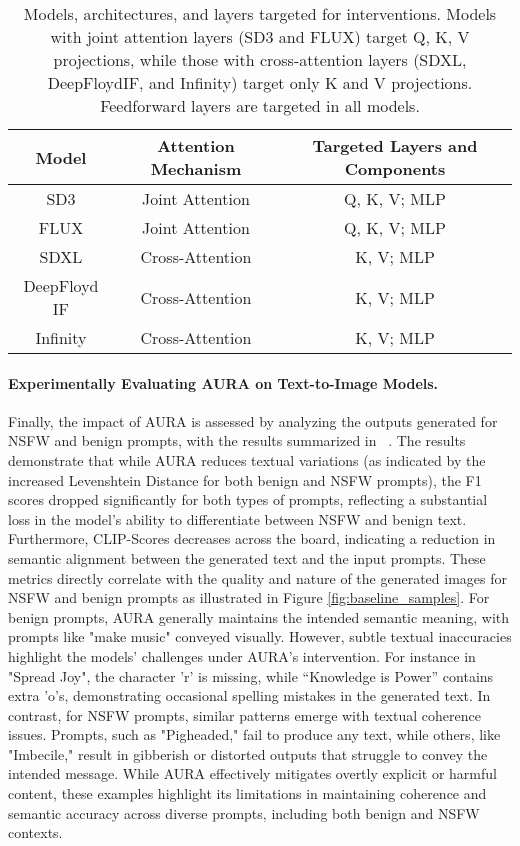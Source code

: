 \begin{table}[h!]
    \centering
    \begin{tabular}{ccc}
        \toprule
        \textbf{Model} & \textbf{Attention Mechanism} & \textbf{Targeted Layers and Components} \\
        \midrule
        SD3 & Joint Attention & Q, K, V; MLP \\
        FLUX & Joint Attention & Q, K, V; MLP \\
        SDXL & Cross-Attention & K, V; MLP \\
        DeepFloyd IF & Cross-Attention & K, V; MLP \\
        Infinity & Cross-Attention & K, V; MLP \\
        \bottomrule
    \end{tabular}
    \caption{Models, architectures, and layers targeted for interventions. Models with joint attention layers (SD3 and FLUX) target Q, K, V projections, while those with cross-attention layers (SDXL, DeepFloydIF, and Infinity) target only K and V projections. Feedforward layers are targeted in all models.}
    \label{tab:models_layers_targeted}
\end{table}

\paragraph{Experimentally Evaluating AURA on Text-to-Image Models.}
Finally, the impact of AURA is assessed by analyzing the outputs generated for NSFW and benign prompts, with the results summarized in ~. The results demonstrate that while AURA reduces textual variations (as indicated by the increased Levenshtein Distance for both benign and NSFW prompts), the F1 scores dropped significantly for both types of prompts, reflecting a substantial loss in the model's ability to differentiate between NSFW and benign text. Furthermore, CLIP-Scores decreases across the board, indicating a reduction in semantic alignment between the generated text and the input prompts. These metrics directly correlate with the quality and nature of the generated images for NSFW and benign prompts as illustrated in Figure \ref{fig:baseline_samples}. For benign prompts, AURA generally maintains the intended semantic meaning, with prompts like "make music" conveyed visually. However, subtle textual inaccuracies highlight the models' challenges under AURA's intervention. For instance in "Spread Joy", the character 'r' is missing, while “Knowledge is Power” contains extra 'o's, demonstrating occasional spelling mistakes in the generated text. In contrast, for NSFW prompts, similar patterns emerge with textual coherence issues. Prompts, such as "Pigheaded," fail to produce any text, while others, like "Imbecile," result in gibberish or distorted outputs that struggle to convey the intended message. While AURA effectively mitigates overtly explicit or harmful content, these examples highlight its limitations in maintaining coherence and semantic accuracy across diverse prompts, including both benign and NSFW contexts.

